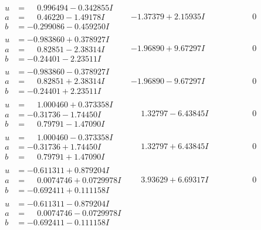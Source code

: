 \documentclass[1p]{elsarticle_modified}
\theoremstyle{definition}
\begin{document}
$$\begin{array}{c|c|c}
\begin{aligned}
u &= \phantom{-}0.996494 - 0.342855 I \\
a &= \phantom{-}0.46220 - 1.49178 I \\
b &= -0.299086 - 0.459250 I\end{aligned}
 & -1.37379 + 2.15935 I & \phantom{-0.000000 } 0 \\ \hline\begin{aligned}
u &= -0.983860 + 0.378927 I \\
a &= \phantom{-}0.82851 - 2.38314 I \\
b &= -0.24401 - 2.23511 I\end{aligned}
 & -1.96890 + 9.67297 I & \phantom{-0.000000 } 0 \\ \hline\begin{aligned}
u &= -0.983860 - 0.378927 I \\
a &= \phantom{-}0.82851 + 2.38314 I \\
b &= -0.24401 + 2.23511 I\end{aligned}
 & -1.96890 - 9.67297 I & \phantom{-0.000000 } 0 \\ \hline\begin{aligned}
u &= \phantom{-}1.000460 + 0.373358 I \\
a &= -0.31736 - 1.74450 I \\
b &= \phantom{-}0.79791 - 1.47090 I\end{aligned}
 & \phantom{-}1.32797 - 6.43845 I & \phantom{-0.000000 } 0 \\ \hline\begin{aligned}
u &= \phantom{-}1.000460 - 0.373358 I \\
a &= -0.31736 + 1.74450 I \\
b &= \phantom{-}0.79791 + 1.47090 I\end{aligned}
 & \phantom{-}1.32797 + 6.43845 I & \phantom{-0.000000 } 0 \\ \hline\begin{aligned}
u &= -0.611311 + 0.879204 I \\
a &= \phantom{-}0.0074746 + 0.0729978 I \\
b &= -0.692411 + 0.111158 I\end{aligned}
 & \phantom{-}3.93629 + 6.69317 I & \phantom{-0.000000 } 0 \\ \hline\begin{aligned}
u &= -0.611311 - 0.879204 I \\
a &= \phantom{-}0.0074746 - 0.0729978 I \\
b &= -0.692411 - 0.111158 I\end{aligned}

\end{array}$$
\end{document}
